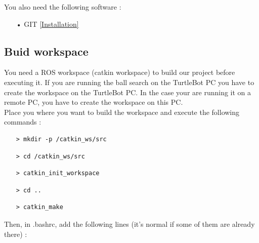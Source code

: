 \documentclass[10pt,a4paper]{article}
\begin{document}
You also need the following software :

\begin{itemize}
\item[•] GIT \href{https://git-scm.com/download/linux}{[Installation]} 
\end{itemize}

\subsection{Buid workspace}

You need a ROS workspace (catkin workspace) to build our project before executing it. If you are running the ball search on the TurtleBot PC you have to create the workspace on the TurtleBot PC. In the case your are running it on a remote PC, you have to create the workspace on this PC.\\

Place you where you want to build the workspace and execute the following commands :

\begin{itemize}
\item[]  \begin{verbatim}> mkdir -p /catkin_ws/src \end{verbatim}
\item[]  \begin{verbatim}> cd /catkin_ws/src \end{verbatim}
\item[]  \begin{verbatim}> catkin_init_workspace \end{verbatim}
\item[]  \begin{verbatim}> cd .. \end{verbatim}
\item[]  \begin{verbatim}> catkin_make \end{verbatim}
\end{itemize}

Then, in .bashrc, add the following lines (it's normal if some of them are already there) :
\end{document}
